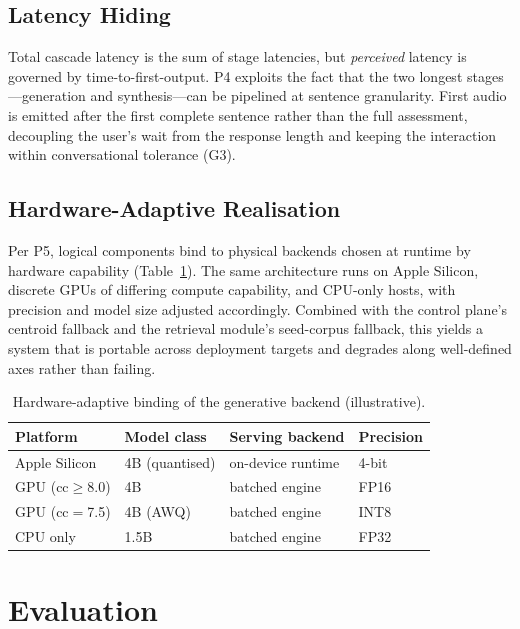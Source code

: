 \documentclass[runningheads]{llncs}
\begin{document}
\subsection{Latency Hiding}

Total cascade latency is the sum of stage latencies, but \emph{perceived} latency is governed by time-to-first-output. P4 exploits the fact that the two longest stages---generation and synthesis---can be pipelined at sentence granularity. First audio is emitted after the first complete sentence rather than the full assessment, decoupling the user's wait from the response length and keeping the interaction within conversational tolerance (G3).

\subsection{Hardware-Adaptive Realisation}

Per P5, logical components bind to physical backends chosen at runtime by hardware capability (Table~\ref{tab:llm_backend}). The same architecture runs on Apple Silicon, discrete GPUs of differing compute capability, and CPU-only hosts, with precision and model size adjusted accordingly. Combined with the control plane's centroid fallback and the retrieval module's seed-corpus fallback, this yields a system that is portable across deployment targets and degrades along well-defined axes rather than failing.

\begin{table}[t]
\caption{Hardware-adaptive binding of the generative backend (illustrative).}\label{tab:llm_backend}
\centering
\begin{tabular}{llll}
\toprule
Platform & Model class & Serving backend & Precision \\
\midrule
Apple Silicon & 4B (quantised) & on-device runtime & 4-bit \\
GPU (cc$\geq$8.0) & 4B & batched engine & FP16 \\
GPU (cc$=$7.5) & 4B (AWQ) & batched engine & INT8 \\
CPU only & 1.5B & batched engine & FP32 \\
\bottomrule
\end{tabular}
\end{table}

\section{Evaluation}
\end{document}
